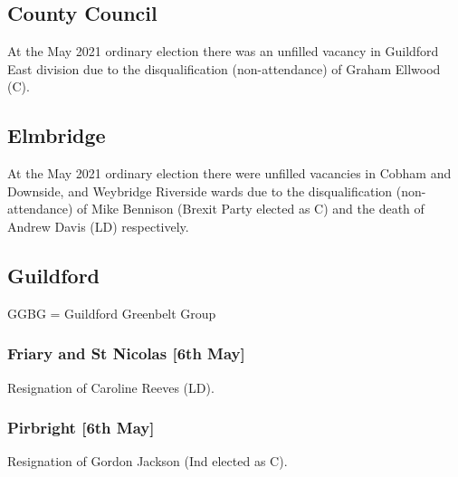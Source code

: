 \documentclass[a4paper,openany]{book}
\begin{document}
\begin{resultsiii}
\subsection*{County Council}

At the May 2021 ordinary election there was an unfilled vacancy in Guildford East division due to the disqualification (non-attendance) of Graham Ellwood (C).

\subsection*{Elmbridge}

At the May 2021 ordinary election there were unfilled vacancies in Cobham and Downside, and Weybridge Riverside wards due to the disqualification (non-attendance) of Mike Bennison (Brexit Party elected as C) and the death of Andrew Davis (LD) respectively.

\subsection*{Guildford}

GGBG = Guildford Greenbelt Group

\subsubsection*{Friary and St Nicolas \hspace*{\fill}\nolinebreak[1]%
	\enspace\hspace*{\fill}
	[6th May]}


Resignation of Caroline Reeves (LD).

\subsubsection*{Pirbright \hspace*{\fill}\nolinebreak[1]%
	\enspace\hspace*{\fill}
	[6th May]}


Resignation of Gordon Jackson (Ind elected as C).


\end{resultsiii}
\end{document}
